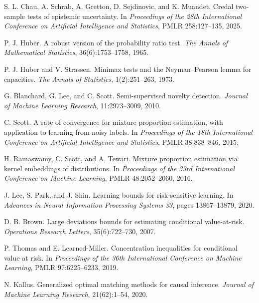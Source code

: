 S. L. Chau, A. Schrab, A. Gretton, D. Sejdinovic, and K. Muandet.
\newblock Credal two-sample tests of epistemic uncertainty.
\newblock In \emph{Proceedings of the 28th International Conference on Artificial Intelligence and Statistics}, PMLR 258:127--135, 2025.

P. J. Huber.
\newblock A robust version of the probability ratio test.
\newblock \emph{The Annals of Mathematical Statistics}, 36(6):1753--1758, 1965.

P. J. Huber and V. Strassen.
\newblock Minimax tests and the Neyman--Pearson lemma for capacities.
\newblock \emph{The Annals of Statistics}, 1(2):251--263, 1973.

G. Blanchard, G. Lee, and C. Scott.
\newblock Semi-supervised novelty detection.
\newblock \emph{Journal of Machine Learning Research}, 11:2973--3009, 2010.

C. Scott.
\newblock A rate of convergence for mixture proportion estimation, with application to learning from noisy labels.
\newblock In \emph{Proceedings of the 18th International Conference on Artificial Intelligence and Statistics}, PMLR 38:838--846, 2015.

H. Ramaswamy, C. Scott, and A. Tewari.
\newblock Mixture proportion estimation via kernel embeddings of distributions.
\newblock In \emph{Proceedings of the 33rd International Conference on Machine Learning}, PMLR 48:2052--2060, 2016.

J. Lee, S. Park, and J. Shin.
\newblock Learning bounds for risk-sensitive learning.
\newblock In \emph{Advances in Neural Information Processing Systems 33}, pages 13867--13879, 2020.

D. B. Brown.
\newblock Large deviations bounds for estimating conditional value-at-risk.
\newblock \emph{Operations Research Letters}, 35(6):722--730, 2007.

P. Thomas and E. Learned-Miller.
\newblock Concentration inequalities for conditional value at risk.
\newblock In \emph{Proceedings of the 36th International Conference on Machine Learning}, PMLR 97:6225--6233, 2019.

N. Kallus.
\newblock Generalized optimal matching methods for causal inference.
\newblock \emph{Journal of Machine Learning Research}, 21(62):1--54, 2020.

